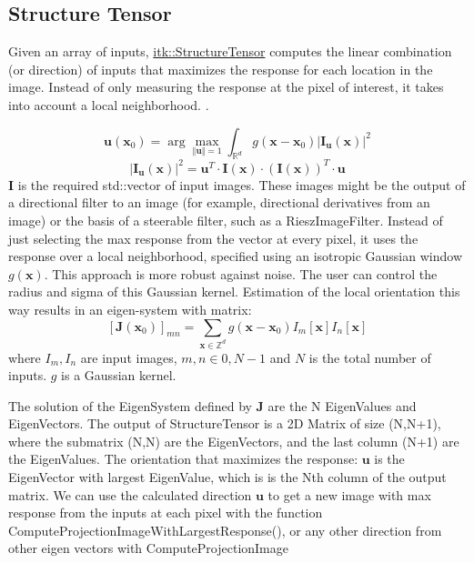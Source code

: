 \documentclass{InsightArticle}
\newcommand{\github}[1]{\href{https://github.com/phcerdan/ITKIsotropicWavelets/blob/master/include/itk#1.h}{itk::#1}}
\theoremstyle{definition}
\begin{document}
\subsection{Structure Tensor}
\label{sub:structure_tensor_impl}

Given an array of inputs, \github{StructureTensor} \cite{unser_steerable_2011} computes the linear combination (or direction) of inputs that maximizes the response for each location in the image. Instead of only measuring the response at the pixel of interest, it takes into account a local neighborhood. \cite{unser_steerable_2011}.

$$
 \mathbf{u}({\mathbf{x}_0}) = \arg \max_{\Vert\mathbf{u}\Vert =1 }  \int_{\mathbb{R}^d} g(\mathbf{x} - \mathbf{x}_0) \left| \mathbf{I}_{\mathbf{u}}(\mathbf{x})\right|^2
$$
$$
 \left| \mathbf{I}_{\mathbf{u}}(\mathbf{x})\right|^2 =
 \mathbf{u}^T \cdot \mathbf{I}(\mathbf{x}) \cdot (\mathbf{I}(\mathbf{x}))^T \cdot \mathbf{u}
$$
 $ \mathbf{I}$ is the required std::vector of input images. These images might be the output of a directional filter to an image
 (for example, directional derivatives from an image) or the basis of a steerable filter, such as a RieszImageFilter.
 Instead of just selecting the max response from the vector at every pixel, it uses the response over
 a local neighborhood, specified using an isotropic Gaussian window $g(\mathbf{x})$.
 This approach is more robust against noise. The user can control the radius and sigma of this Gaussian kernel.
 Estimation of the local orientation this way results in an eigen-system with matrix:
 $$
 [\mathbf{J}(\mathbf{x}_0)]_{mn} = \sum_{\mathbf{x} \in \mathbb{Z}^d} g(\mathbf{x} - \mathbf{x}_0) I_m[\mathbf{x}]I_n[\mathbf{x}]
 $$
 where $I_m, I_n $ are input images, $ m,n \in {0,N-1} $ and $N$ is the total number of inputs.
 $g$ is a Gaussian kernel.

 The solution of the EigenSystem defined by $\mathbf{J}$ are the N EigenValues and EigenVectors.
 The output of StructureTensor is a 2D Matrix of size (N,N+1), where the submatrix (N,N) are the EigenVectors, and the last column (N+1) are the EigenValues.
 The orientation that maximizes the response: $\bm{u}$ is the EigenVector with largest EigenValue, which is is the Nth column of the output matrix.
 We can use the calculated direction $\bm{u}$ to get a new image with max response from the inputs at each pixel with the function ComputeProjectionImageWithLargestResponse(),
 or any other direction from other eigen vectors with ComputeProjectionImage
\end{document}
